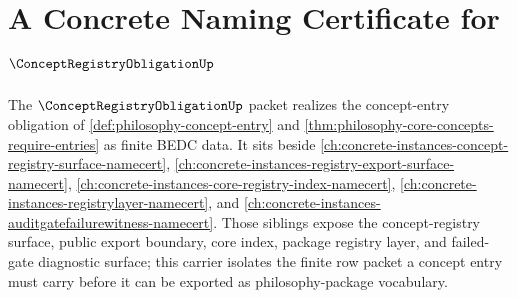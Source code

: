 \chapter{A Concrete Naming Certificate for $\ConceptRegistryObligationUp$}
\label{ch:concrete-instances-conceptregistryobligation-namecert}

The $\ConceptRegistryObligationUp$ packet realizes the concept-entry obligation of \autoref{def:philosophy-concept-entry} and \autoref{thm:philosophy-core-concepts-require-entries} as finite BEDC data. It sits beside \autoref{ch:concrete-instances-concept-registry-surface-namecert}, \autoref{ch:concrete-instances-registry-export-surface-namecert}, \autoref{ch:concrete-instances-core-registry-index-namecert}, \autoref{ch:concrete-instances-registrylayer-namecert}, and \autoref{ch:concrete-instances-auditgatefailurewitness-namecert}. Those siblings expose the concept-registry surface, public export boundary, core index, package registry layer, and failed-gate diagnostic surface; this carrier isolates the finite row packet a concept entry must carry before it can be exported as philosophy-package vocabulary.

